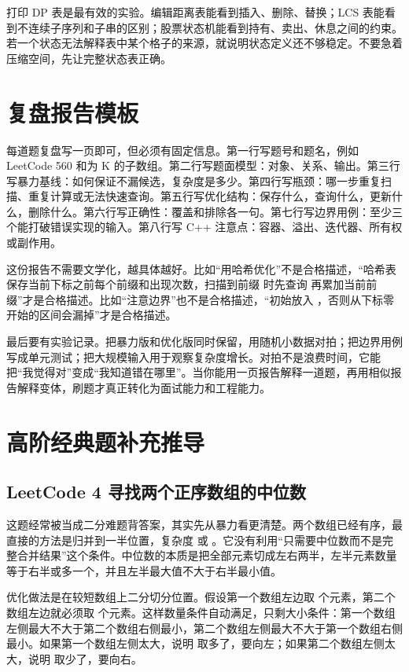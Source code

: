 打印 DP 表是最有效的实验。编辑距离表能看到插入、删除、替换；LCS 表能看到不连续子序列和子串的区别；股票状态机能看到持有、卖出、休息之间的约束。若一个状态无法解释表中某个格子的来源，就说明状态定义还不够稳定。不要急着压缩空间，先让完整状态表正确。

\section{复盘报告模板}

每道题复盘写一页即可，但必须有固定信息。第一行写题号和题名，例如 LeetCode 560 和为 K 的子数组。第二行写题面模型：对象、关系、输出。第三行写暴力基线：如何保证不漏候选，复杂度是多少。第四行写瓶颈：哪一步重复扫描、重复计算或无法快速查询。第五行写优化结构：保存什么，查询什么，更新什么，删除什么。第六行写正确性：覆盖和排除各一句。第七行写边界用例：至少三个能打破错误实现的输入。第八行写 C++ 注意点：容器、溢出、迭代器、所有权或副作用。

这份报告不需要文学化，越具体越好。比如“用哈希优化”不是合格描述，“哈希表保存当前下标之前每个前缀和出现次数，扫描到前缀  时先查询  再累加当前前缀”才是合格描述。比如“注意边界”也不是合格描述，“初始放入 ，否则从下标零开始的区间会漏掉”才是合格描述。

最后要有实验记录。把暴力版和优化版同时保留，用随机小数据对拍；把边界用例写成单元测试；把大规模输入用于观察复杂度增长。对拍不是浪费时间，它能把“我觉得对”变成“我知道错在哪里”。当你能用一页报告解释一道题，再用相似报告解释变体，刷题才真正转化为面试能力和工程能力。

\section{高阶经典题补充推导}

\subsection{LeetCode 4 寻找两个正序数组的中位数}

这题经常被当成二分难题背答案，其实先从暴力看更清楚。两个数组已经有序，最直接的方法是归并到一半位置，复杂度  或 。它没有利用“只需要中位数而不是完整合并结果”这个条件。中位数的本质是把全部元素切成左右两半，左半元素数量等于右半或多一个，并且左半最大值不大于右半最小值。

优化做法是在较短数组上二分切分位置。假设第一个数组左边取  个元素，第二个数组左边就必须取  个元素。这样数量条件自动满足，只剩大小条件：第一个数组左侧最大不大于第二个数组右侧最小，第二个数组左侧最大不大于第一个数组右侧最小。如果第一个数组左侧太大，说明  取多了，要向左；如果第二个数组左侧太大，说明  取少了，要向右。


